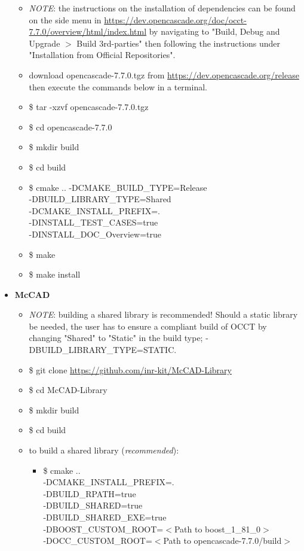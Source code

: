 \documentclass[12pt, a4paper, titlepage]{article}
\begin{document}
\begin{itemize}
      \begin{itemize}
        \item \emph{NOTE}: the instructions on the installation of dependencies can be found on the side menu in \url{https://dev.opencascade.org/doc/occt-7.7.0/overview/html/index.html} by navigating to "Build, Debug and Upgrade $>$ Build 3rd-parties" then following the instructions under "Installation from Official Repositories".
    	\item download opencascade-7.7.0.tgz from \url{https://dev.opencascade.org/release} then execute the commands below in a terminal.
    	\item \$ tar -xzvf opencascade-7.7.0.tgz
    	\item \$ cd opencascade-7.7.0
    	\item \$ mkdir build
    	\item \$ cd build
    	\item \$ cmake .. -DCMAKE\_BUILD\_TYPE=Release \\-DBUILD\_LIBRARY\_TYPE=Shared \\-DCMAKE\_INSTALL\_PREFIX=. \\-DINSTALL\_TEST\_CASES=true \\-DINSTALL\_DOC\_Overview=true
    	\item \$ make
    	\item \$ make install
      \end{itemize}
	  \item \textbf{McCAD}
	  \begin{itemize}
		\item \emph{NOTE}: building a shared library is recommended! Should a static library be needed, the user has to ensure a compliant build of OCCT by changing "Shared" to "Static" in the build type; -DBUILD\_LIBRARY\_TYPE=STATIC.
		\item \$ git clone \url{https://github.com/inr-kit/McCAD-Library}
		\item \$ cd McCAD-Library
		\item \$ mkdir build
		\item \$ cd build
		\item to build a shared library (\emph{recommended}):
		  \begin{itemize}
			\item \$ cmake .. \\-DCMAKE\_INSTALL\_PREFIX=. \\-DBUILD\_RPATH=true \\-DBUILD\_SHARED=true \\-DBUILD\_SHARED\_EXE=true \\-DBOOST\_CUSTOM\_ROOT=$<$Path to boost\_1\_81\_0$>$ \\-DOCC\_CUSTOM\_ROOT=$<$Path to opencascade-7.7.0/build$>$ 

\end{itemize}
\end{itemize}
\end{itemize}
\end{document}
